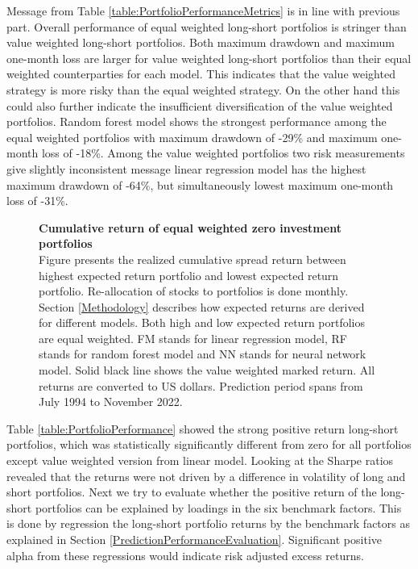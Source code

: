 \documentclass[12pt]{article}
\begin{document}
Message from Table \ref{table:PortfolioPerformanceMetrics} is in line with previous part. Overall performance of equal weighted long-short portfolios is stringer than value weighted long-short portfolios. Both maximum drawdown and maximum one-month loss are larger for value weighted long-short portfolios than their equal weighted counterparties for each model. This indicates that the value weighted strategy is more risky than the equal weighted strategy. On the other hand this could also further indicate the insufficient diversification of the value weighted portfolios. Random forest model shows the strongest performance among the equal weighted portfolios with maximum drawdown of -29\% and maximum one-month loss of -18\%. Among the value weighted portfolios two risk measurements give slightly inconsistent message linear regression model has the highest maximum drawdown of -64\%, but simultaneously lowest maximum one-month loss of -31\%. \par

\begin{figure}[ht]
\centering
\caption[Cumulative return of equal weighted zero investment portfolios]{\textbf{Cumulative return of equal weighted zero investment portfolios}\\ Figure presents the realized cumulative spread return between highest expected return portfolio and lowest expected return portfolio. Re-allocation of stocks to portfolios is done monthly. Section \ref{Methodology} describes how expected returns are derived for different models. Both high and low expected return portfolios are equal weighted. FM stands for linear regression model, RF stands for random forest model and NN stands for neural network model. Solid black line shows the value weighted marked return. All returns are converted to US dollars. Prediction period spans from July 1994 to November 2022.}

\label{plot:cumul_ew_LS_portf_return}
\end{figure}

Table \ref{table:PortfolioPerformance} showed the strong positive return long-short portfolios, which was statistically significantly different from zero for all portfolios except value weighted version from linear model. Looking at the Sharpe ratios revealed that the returns were not driven by a difference in volatility of long and short portfolios. Next we try to evaluate whether the positive return of the long-short portfolios can be explained by loadings in the six benchmark factors. This is done by regression the long-short portfolio returns by the benchmark factors as explained in Section \ref{PredictionPerformanceEvaluation}. Significant positive alpha from these regressions would indicate risk adjusted excess returns. \par
\end{document}
